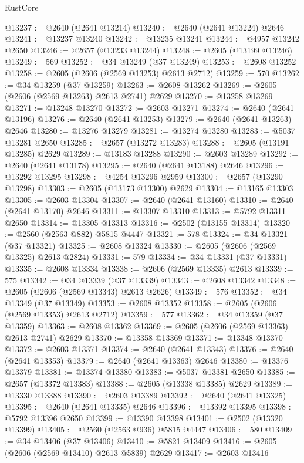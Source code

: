 \begin{lexlean}{RustCore}
\begin{coremodule}
@13237 := @2640 (@2641 @13214)
@13240 := @2640 (@2641 @13224) @2646
@13241 := @13237 @13240
@13242 := @13235 @13241
@13244 := @4957 @13242 @2650
@13246 := @2657 (@13233 @13244)
@13248 := @2605 (@13199 @13246)
@13249 := 569
@13252 := @34 @13249 (@37 @13249)
@13253 := @2608 @13252
@13258 := @2605 (@2606 (@2569 @13253) @2613 @2712)
@13259 := 570
@13262 := @34 @13259 (@37 @13259)
@13263 := @2608 @13262
@13269 := @2605 (@2606 (@2569 @13263) @2613 @2741) @2629
@13270 := @13258 @13269
@13271 := @13248 @13270
@13272 := @2603 @13271
@13274 := @2640 (@2641 @13196)
@13276 := @2640 (@2641 @13253)
@13279 := @2640 (@2641 @13263) @2646
@13280 := @13276 @13279
@13281 := @13274 @13280
@13283 := @5037 @13281 @2650
@13285 := @2657 (@13272 @13283)
@13288 := @2605 (@13191 @13285) @2629
@13289 := @13183 @13288
@13290 := @2603 @13289
@13292 := @2640 (@2641 @13178)
@13295 := @2640 (@2641 @13188) @2646
@13296 := @13292 @13295
@13298 := @4254 @13296 @2959
@13300 := @2657 (@13290 @13298)
@13303 := @2605 (@13173 @13300) @2629
@13304 := @13165 @13303
@13305 := @2603 @13304
@13307 := @2640 (@2641 @13160)
@13310 := @2640 (@2641 @13170) @2646
@13311 := @13307 @13310
@13313 := @5792 @13311 @2650
@13314 := @13305 @13313
@13316 := @2502 (@13155 @13314)
@13320 := @2560 (@2563 @882) @5815 @4447
@13321 := 578
@13324 := @34 @13321 (@37 @13321)
@13325 := @2608 @13324
@13330 := @2605 (@2606 (@2569 @13325) @2613 @2824)
@13331 := 579
@13334 := @34 @13331 (@37 @13331)
@13335 := @2608 @13334
@13338 := @2606 (@2569 @13335) @2613
@13339 := 575
@13342 := @34 @13339 (@37 @13339)
@13343 := @2608 @13342
@13348 := @2605 (@2606 (@2569 @13343) @2613 @2626)
@13349 := 576
@13352 := @34 @13349 (@37 @13349)
@13353 := @2608 @13352
@13358 := @2605 (@2606 (@2569 @13353) @2613 @2712)
@13359 := 577
@13362 := @34 @13359 (@37 @13359)
@13363 := @2608 @13362
@13369 := @2605 (@2606 (@2569 @13363) @2613 @2741) @2629
@13370 := @13358 @13369
@13371 := @13348 @13370
@13372 := @2603 @13371
@13374 := @2640 (@2641 @13343)
@13376 := @2640 (@2641 @13353)
@13379 := @2640 (@2641 @13363) @2646
@13380 := @13376 @13379
@13381 := @13374 @13380
@13383 := @5037 @13381 @2650
@13385 := @2657 (@13372 @13383)
@13388 := @2605 (@13338 @13385) @2629
@13389 := @13330 @13388
@13390 := @2603 @13389
@13392 := @2640 (@2641 @13325)
@13395 := @2640 (@2641 @13335) @2646
@13396 := @13392 @13395
@13398 := @5792 @13396 @2650
@13399 := @13390 @13398
@13401 := @2502 (@13320 @13399)
@13405 := @2560 (@2563 @936) @5815 @4447
@13406 := 580
@13409 := @34 @13406 (@37 @13406)
@13410 := @5821 @13409
@13416 := @2605 (@2606 (@2569 @13410) @2613 @5839) @2629
@13417 := @2603 @13416

\end{coremodule}
\end{lexlean}
